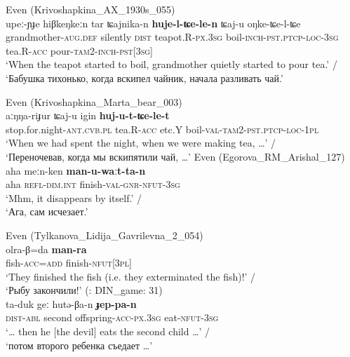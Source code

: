 \documentclass[output=paper,colorlinks,citecolor=brown]{langscibook}
\begin{document}
\ea
    \label{example2.5}
    \ea
     Even (Krivoshapkina\_AX\_1930s\_055)\\
    \gll upeː-ɲɟe	hiβkeŋkeːn	tar	ʨajnika-n   \textbf{huje-l-ʨe-le-n}	ʨaj-u	oŋke-ʨe-l-ʨe\\
    grandmother-\textsc{aug.def}	silently	\textsc{dist}	teapot.R\textsc{-px.3sg} boil\textsc{-inch-pst.ptcp-loc-3sg}	tea.R-\textsc{acc}	pour-\textsc{tam2-inch-pst[3sg]}\\
    \glt ‘When the teapot started to boil, grandmother quietly started to pour tea.’ /\\‘Бабушка тихонько, когда вскипел чайник, начала разливать чай.’

\ex
     Even (Krivoshapkina\_Marta\_bear\_003)\\
    \gll aːŋŋa-riɟur	ʨaj-u	igin	\textbf{huj-u-t-ʨe-le-t}\\
    stop.for.night-\textsc{ant.cvb.pl}	tea.R-\textsc{acc}	etc.Y	boil-\textsc{val-tam2-pst.ptcp-loc-1pl}\\
    \glt ‘When we had spent the night, when we were making tea, …’ /\\‘Переночевав, когда мы вскипятили чай, …’
    \z
\ex
    \label{example2.6}
    \ea
     Even (Egorova\_RM\_Arishal\_127)\\
    \gll aha	meːn-ken	\textbf{man-u-waːt-ta-n}\\
    aha	\textsc{refl-dim.int}	finish-\textsc{val-gnr-nfut-3sg}\\
    \glt ‘Mhm, it disappears by itself.’ /\\‘Ага, сам исчезает.’

\pagebreak
\ex
     Even (Tylkanova\_Lidija\_Gavrilevna\_2\_054)\\
    \gll olra-β=da	\textbf{man-ra}\\
    fish-\textsc{acc=add}	finish-\textsc{nfut[3pl]}\\
    \glt ‘They finished the fish (i.e. they exterminated the fish)!’ /\\‘Рыбу закончили!’
    \z
\ex
    \label{example2.7}
    \ea
     (\citealt{Pakendorf2017}: DIN\_game: 31)\\
    \gll ta-duk	geː	hutə-βa-n	\textbf{ɟep-pa-n}\\
    \textsc{dist-abl}	second	offspring-\textsc{acc-px.3sg}	eat-\textsc{nfut-3sg}\\
    \glt ‘… then he [the devil] eats the second child …’ /\\‘потом второго ребенка съедает …’\\
\end{document}
